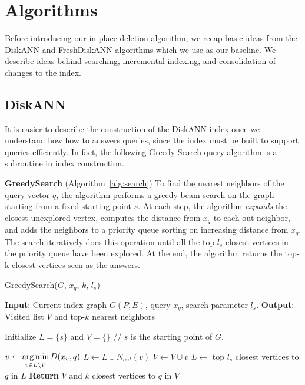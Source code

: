\section{Algorithms}
\label{sec:algorithms}

Before introducing our in-place deletion algorithm,
we recap basic ideas from the DiskANN and FreshDiskANN algorithms which we use as our baseline.
We describe ideas behind searching, incremental indexing, and consolidation of changes to the index.


\subsection{DiskANN}

It is easier to describe the  construction of the DiskANN index once we understand how
how to answers queries, since the index must be built to support queries efficiently.
In fact, the following Greedy Search query algorithm is a subroutine in index construction.

\textsf{{\bf GreedySearch} (Algorithm~\ref{alg:search})} 
To find the nearest neighbors of the query vector $q$, the algorithm performs 
a greedy beam search  on the graph starting from a fixed starting point $s$.
At each step, the algorithm \emph{expands} the closest unexplored vertex,
computes the distance from $x_q$ to each out-neighbor, and adds the neighbors
to a priority queue sorting on increasing distance from $x_q$.
The search iteratively does this operation until all the top-$l_s$
closest vertices in the priority queue have been explored. 
At the end, the algorithm returns the top-k closest vertices seen as the answers.

\begin{algorithm}[h]
\caption{GreedySearch($G$, $x_q$, $k$, $l_s$)}
\label{alg:search}
\begin{algorithmic}[1]
\State \textbf{Input}: Current index graph $G(P,E)$, query $x_q$, search parameter $l_s$.
\State \textbf{Output}: Visited list $V$ and top-$k$ nearest neighbors

\State Initialize $L=\{s\}$ and $V=\{\}$ // $s$ is the starting point of $G$.

\State $v\gets\operatorname*{arg\,min}\limits_{v\in L\setminus V} D(x_v,q)$
\State $L\gets L\cup N_{out}(v)$
\State $V\gets V\cup v$
\State $L\gets$ top $l_s$ closest vertices to $q$ in $L$
\EndIf
\EndWhile
\State \textbf{Return} $V$ and $k$ closest vertices to $q$ in $V$
\end{algorithmic}
\end{algorithm}

